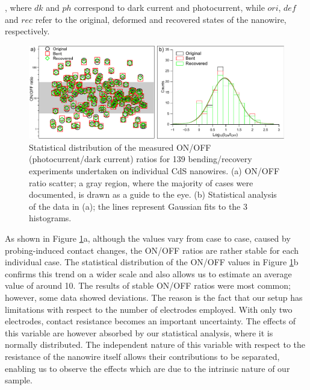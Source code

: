 , where $dk$ and $ph$ correspond to dark current and photocurrent, while $ori$, $def$ and $rec$ refer to the original, deformed and recovered states of the nanowire, respectively.\\

\begin{figure}  
\includegraphics[width=\textwidth]{figures/figure6_3}
\caption[Statistical distribution of ON/OFF ratios]
{Statistical distribution of the measured ON/OFF (photocurrent/dark current) ratios for 139 bending/recovery experiments undertaken on individual CdS nanowires. (a) ON/OFF ratio scatter; a gray region, where the majority of cases were documented, is drawn as a guide to the eye. (b) Statistical analysis of the data in (a); the lines represent Gaussian fits to the 3 histograms.
\label{fig:6_3}}
\end{figure}

As shown in Figure \ref{fig:6_3}a, although the values vary from case to case, caused by probing-induced contact changes, the ON/OFF ratios are rather stable for each individual case. The statistical distribution of the ON/OFF values in Figure \ref{fig:6_3}b confirms this trend on a wider scale and also allows us to estimate an average value of around 10. The results of stable ON/OFF ratios were most common; however, some data showed deviations. The reason is the fact that our setup has limitations with respect to the number of electrodes employed. With only two electrodes, contact resistance becomes an important uncertainty.\cite{Hummelgard2011} The effects of this variable are however absorbed by our statistical analysis, where it is normally distributed. The independent nature of this variable with respect to the resistance of the nanowire itself allows their contributions to be separated, enabling us to observe the effects which are due to the intrinsic nature of our sample.


